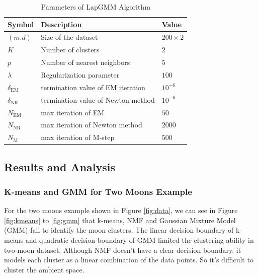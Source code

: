 \documentclass[10pt,journal,compsoc]{IEEEtran}
\begin{document}
    \begin{table}[H]
        \centering
        \begin{tabular}{|l|l|l|}
            \hline
            Symbol & Description & Value  \\
            \hline
            $(m.d)$ & Size of the dataset & $200\times 2$\\ 
            \hline
            $K$ & Number of clusters & $2$\\
            \hline
            $p$ & Number of nearest neighbors & $5$\\
            \hline
            $\lambda$ & Regularization parameter & $100$\\
            \hline
            $\delta_{\mathrm{EM}}$ & termination value of EM iteration & $10^{-6}$\\
            \hline
            $\delta_{\mathrm{NR}}$ & termination value of Newton method & $10^{-6}$\\
            \hline
            $N_{\mathrm{EM}}$ & max iteration of EM & $50$\\
            \hline
            $N_{\mathrm{NR}}$ & max iteration of Newton method & $2000$\\
            \hline
            $N_{\mathrm{M}}$ & max iteration of M-step & $500$\\
            \hline
        \end{tabular}
        \caption{Parameters of LapGMM Algorithm}
        \label{tab:parameter-lapgmm}
    \end{table}
    


    \subsection{Results and Analysis}
    
    
    
    
    
    \subsubsection{K-means and GMM for Two Moons Example}
    
    For the two moons example shown in Figure \ref{fig:data}, we can see in Figure \ref{fig:kmeans} to \ref{fig:gmm} that k-means, NMF and Gaussian Mixture Model (GMM) fail to identify the moon clusters. The linear decision boundary of k-means and quadratic decision boundary of GMM limited the clustering ability in two-moon dataset. Although NMF doesn't have a clear decision boundary, it models each cluster as a linear combination of the data points. So it's difficult to cluster the ambient space.
    
\end{document}
